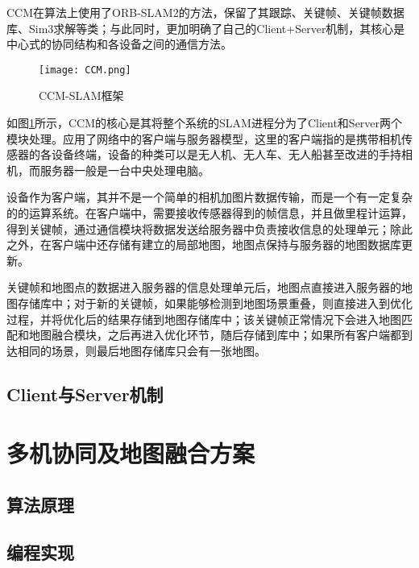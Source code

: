 CCM在算法上使用了ORB-SLAM2的方法，保留了其跟踪、关键帧、关键帧数据库、Sim3求解等类；与此同时，更加明确了自己的Client+Server机制，其核心是中心式的协同结构和各设备之间的通信方法。

\begin{figure}[!ht]
	\centering
	\texttt{[image: CCM.png]}
	\caption{CCM-SLAM框架}
	\label{fig11}
\end{figure}

如图\ref{fig11}所示，CCM的核心是其将整个系统的SLAM进程分为了Client和Server两个模块处理。应用了网络中的客户端与服务器模型，这里的客户端指的是携带相机传感器的各设备终端，设备的种类可以是无人机、无人车、无人船甚至改进的手持相机，而服务器一般是一台中央处理电脑。

设备作为客户端，其并不是一个简单的相机加图片数据传输，而是一个有一定复杂的的运算系统。在客户端中，需要接收传感器得到的帧信息，并且做里程计运算，得到关键帧，通过通信模块将数据发送给服务器中负责接收信息的处理单元；除此之外，在客户端中还存储有建立的局部地图，地图点保持与服务器的地图数据库更新。

关键帧和地图点的数据进入服务器的信息处理单元后，地图点直接进入服务器的地图存储库中；对于新的关键帧，如果能够检测到地图场景重叠，则直接进入到优化过程，并将优化后的结果存储到地图存储库中；该关键帧正常情况下会进入地图匹配和地图融合模块，之后再进入优化环节，随后存储到库中；如果所有客户端都到达相同的场景，则最后地图存储库只会有一张地图。



\subsection{Client与Server机制} \label{3.3.2}







\section{多机协同及地图融合方案}





\subsection{算法原理} \label{3.4.1}






\subsection{编程实现} \label{3.4.2}









